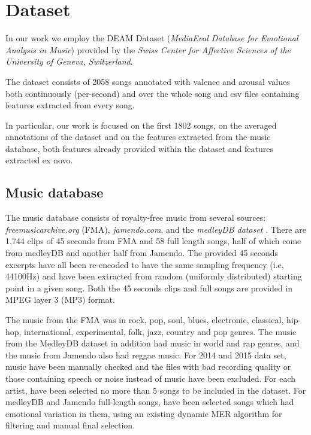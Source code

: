 \section{Dataset}
In our work we employ the DEAM Dataset (\textit{MediaEval Database for Emotional Analysis in Music}) provided by the \textit{Swiss Center for Affective Sciences of the University of Geneva, Switzerland}.

The dataset consists of 2058 songs annotated with valence and arousal values both continuously (per-second) and over the whole song and csv files containing features extracted from every song.

In particular, our work is focused on the first 1802 songs, on the averaged annotations of the dataset and on the features extracted from the music database, both features already provided within the dataset and features extracted ex novo.


\subsection{Music database}

The music database consists of royalty-free music from several sources: \textit{freemusicarchive.org} (FMA), \textit{jamendo.com}, and the \textit{medleyDB dataset} \cite{bittner2014medleydb}. There are 1,744 clips of 45 seconds from FMA and 58 full length songs, half of which come from medleyDB and another half from Jamendo.\cite{aljanaki2017developing}
The provided 45 seconds excerpts have all been re-encoded to have the same sampling frequency (i.e, 44100Hz) and have been extracted from random (uniformly distributed) starting point in a given song. Both the 45 seconds clips and full songs are provided in MPEG layer 3 (MP3) format.\cite{soleymani2016deam}

The music from the FMA was in rock, pop, soul, blues, electronic, classical, hip-hop, international, experimental, folk, jazz, country and pop genres. The music from the MedleyDB dataset in addition had music in world and rap genres, and the music from Jamendo also had reggae music. For 2014 and 2015 data set, music have been manually checked and the files with bad recording quality or those containing speech or noise instead of music have been excluded. For each artist, have been selected no more than 5 songs to be included in the dataset. For medleyDB and Jamendo full-length songs, have been selected songs which had emotional variation in them, using an existing dynamic MER algorithm for filtering and manual final selection\cite{anna2015emotion}.


